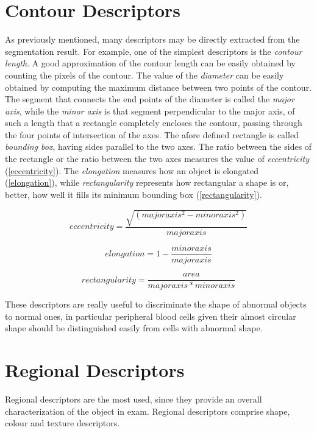 \documentclass[final,a4paper,12pt,english]{UnicaPhdThesis3}
\begin{document}
\section{Contour Descriptors} %
As previously mentioned, many descriptors may be directly extracted from the segmentation result. For example, one of the simplest descriptors is the \textit{contour length}. A good approximation of the contour length can be easily obtained by counting the pixels of the contour. The value of the \textit{diameter} can be easily obtained by computing the maximum distance between two points of the contour. The segment that connects the end points of the diameter is called the \textit{major axis}, while the \textit{minor axis} is that segment perpendicular to the major axis, of such a length that a rectangle completely encloses the contour, passing through the four points of intersection of the axes. The afore defined rectangle is called \textit{bounding box}, having sides parallel to the two axes. The ratio between the sides of the rectangle or the ratio between the two axes measures the value of \textit{eccentricity} (\ref{eccentricity}). The \textit{elongation} measures how an object is elongated (\ref{elongation}), while \textit{rectangularity} represents how rectangular a shape is or, better, how well it fills its minimum bounding box (\ref{rectangularity}).

\begin{equation}\label{eccentricity}
eccentricity=\frac{\sqrt{(major axis^2 - minor axis^2) }}{major axis}
\end{equation}

\begin{equation}\label{elongation}
elongation=1 - \frac{minor axis}{major axis}
\end{equation}

\begin{equation}\label{rectangularity}
rectangularity=\frac{area}{major axis*minor axis}
\end{equation}

These descriptors are really useful to discriminate the shape of abnormal objects to normal ones, in particular peripheral blood cells given their almost circular shape should be distinguished easily from cells with abnormal shape. 

\section{Regional Descriptors} %
Regional descriptors are the most used, since they provide an overall characterization of the object in exam. Regional descriptors comprise shape, colour and texture descriptors.
\end{document}
